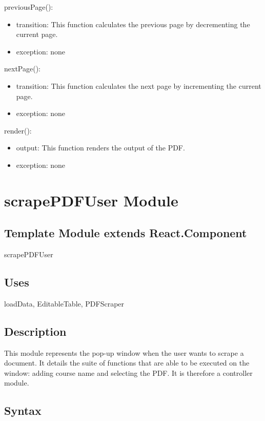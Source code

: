 \documentclass[12pt, titlepage]{article}
\begin{document}
\noindent previousPage():
\begin{itemize}
\item transition: This function calculates the previous page by decrementing the current page.
\item exception: none
\end{itemize}

\noindent nextPage():
\begin{itemize}
\item transition: This function calculates the next page by incrementing the current page.
\item exception: none
\end{itemize}

\noindent render():
\begin{itemize}
\item output: This function renders the output of the PDF.
\item exception: none
\end{itemize}

\newpage

\section{scrapePDFUser Module}

\subsection{Template Module extends React.Component}

scrapePDFUser

\subsection{Uses}

loadData, EditableTable, PDFScraper

\subsection{Description}
This module represents the pop-up window when the user wants to scrape a document. It details the suite of functions that are able to be executed on the window: adding course name and selecting the PDF. It is therefore a controller module.

\subsection{Syntax}
\end{document}
